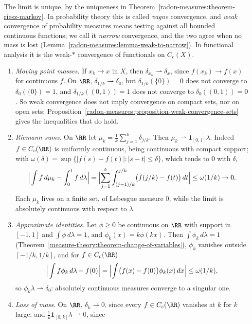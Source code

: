 The limit is unique, by the uniqueness in Theorem~\ref{radon-measures:theorem-riesz-markov}. In probability theory this is called \emph{vague} convergence, and \emph{weak} convergence of probability
measures means testing against all bounded continuous functions; we call it \emph{narrow} convergence, and the two agree when no mass is lost
(Lemma~\ref{radon-measures:lemma-weak-to-narrow}). In functional analysis it is the weak-$*$
convergence of functionals on $C_c(X)$.

\begin{example}\label{radon-measures:example-weak-convergence}
\begin{enumerate}
\item \emph{Moving point masses.} If $x_k \to x$ in $X$, then $\delta_{x_k} \rightharpoonup \delta_x$, since $f(x_k) \to f(x)$ for continuous $f$. On $\RR$, $\delta_{1/k} \rightharpoonup \delta_0$, but
$\delta_{1/k}(\{0\}) = 0$ does not converge to $\delta_0(\{0\}) = 1$, and $\delta_{1/k}((0, 1)) = 1$ does not converge to $\delta_0((0, 1)) = 0$. So weak convergence does not imply convergence on
compact sets, nor on open sets; Proposition~\ref{radon-measures:proposition-weak-convergence-sets} gives the inequalities that do hold.
\item \emph{Riemann sums.} On $\RR$ let $\mu_k = \frac1k\sum_{j=1}^k\delta_{j/k}$. Then $\mu_k \rightharpoonup \mathbf{1}_{[0, 1]}\lambda$. Indeed $f \in C_c(\RR)$ is uniformly continuous, being
continuous with compact support; with $\omega(\delta) = \sup\{|f(s) - f(t)| : |s - t| \leq \delta\}$, which tends to $0$ with $\delta$,
\[
\Bigl|\int f\,d\mu_k - \int_0^1f\,d\lambda\Bigr| = \Bigl|\sum_{j=1}^k\int_{(j-1)/k}^{j/k}\bigl(f(j/k) - f(t)\bigr)\,dt\Bigr| \leq \omega(1/k) \to 0.
\]
Each $\mu_k$ lives on a finite set, of Lebesgue measure $0$, while the limit is absolutely continuous with respect to $\lambda$.
\item \emph{Approximate identities.} Let $\phi \geq 0$ be continuous on $\RR$ with support in $[-1, 1]$ and $\int\phi\,d\lambda = 1$, and $\phi_k(x) = k\phi(kx)$. Then $\int\phi_k\,d\lambda = 1$
(Theorem~\ref{measure-theory:theorem-change-of-variables}), $\phi_k$ vanishes outside $[-1/k, 1/k]$, and for $f \in C_c(\RR)$
\[
\Bigl|\int f\phi_k\,d\lambda - f(0)\Bigr| = \Bigl|\int\bigl(f(x) - f(0)\bigr)\phi_k(x)\,dx\Bigr| \leq \omega(1/k),
\]
so $\phi_k\lambda \rightharpoonup \delta_0$: absolutely continuous measures converge to a singular one.
\item \emph{Loss of mass.} On $\RR$, $\delta_k \rightharpoonup 0$, since every $f \in C_c(\RR)$ vanishes at $k$ for $k$ large; and $\frac1k\mathbf{1}_{[0, k]}\lambda \rightharpoonup 0$, since

\end{enumerate}
\end{example}
